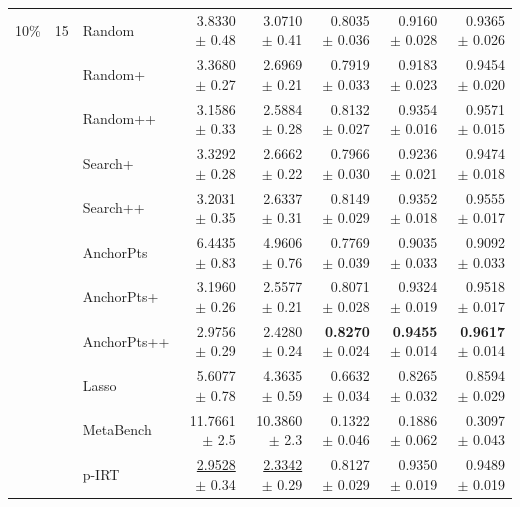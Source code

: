 \begin{longtable}{llp{}rrrrr}
\midrule
10\% & 15 & Random & 3.8330 {\scriptsize $\pm$ 0.48} & 3.0710 {\scriptsize $\pm$ 0.41} & 0.8035 {\scriptsize $\pm$ 0.036} & 0.9160 {\scriptsize $\pm$ 0.028} & 0.9365 {\scriptsize $\pm$ 0.026} \\
 &  & Random+ & 3.3680 {\scriptsize $\pm$ 0.27} & 2.6969 {\scriptsize $\pm$ 0.21} & 0.7919 {\scriptsize $\pm$ 0.033} & 0.9183 {\scriptsize $\pm$ 0.023} & 0.9454 {\scriptsize $\pm$ 0.020} \\
 &  & Random++ & 3.1586 {\scriptsize $\pm$ 0.33} & 2.5884 {\scriptsize $\pm$ 0.28} & 0.8132 {\scriptsize $\pm$ 0.027} & 0.9354 {\scriptsize $\pm$ 0.016} & 0.9571 {\scriptsize $\pm$ 0.015} \\
 &  & Search+ & 3.3292 {\scriptsize $\pm$ 0.28} & 2.6662 {\scriptsize $\pm$ 0.22} & 0.7966 {\scriptsize $\pm$ 0.030} & 0.9236 {\scriptsize $\pm$ 0.021} & 0.9474 {\scriptsize $\pm$ 0.018} \\
 &  & Search++ & 3.2031 {\scriptsize $\pm$ 0.35} & 2.6337 {\scriptsize $\pm$ 0.31} & 0.8149 {\scriptsize $\pm$ 0.029} & 0.9352 {\scriptsize $\pm$ 0.018} & 0.9555 {\scriptsize $\pm$ 0.017} \\
 &  & AnchorPts & 6.4435 {\scriptsize $\pm$ 0.83} & 4.9606 {\scriptsize $\pm$ 0.76} & 0.7769 {\scriptsize $\pm$ 0.039} & 0.9035 {\scriptsize $\pm$ 0.033} & 0.9092 {\scriptsize $\pm$ 0.033} \\
 &  & AnchorPts+ & 3.1960 {\scriptsize $\pm$ 0.26} & 2.5577 {\scriptsize $\pm$ 0.21} & 0.8071 {\scriptsize $\pm$ 0.028} & 0.9324 {\scriptsize $\pm$ 0.019} & 0.9518 {\scriptsize $\pm$ 0.017} \\
 &  & AnchorPts++ & 2.9756 {\scriptsize $\pm$ 0.29} & 2.4280 {\scriptsize $\pm$ 0.24} & \textbf{0.8270} {\scriptsize $\pm$ 0.024} & \textbf{0.9455} {\scriptsize $\pm$ 0.014} & \textbf{0.9617} {\scriptsize $\pm$ 0.014} \\
 &  & Lasso & 5.6077 {\scriptsize $\pm$ 0.78} & 4.3635 {\scriptsize $\pm$ 0.59} & 0.6632 {\scriptsize $\pm$ 0.034} & 0.8265 {\scriptsize $\pm$ 0.032} & 0.8594 {\scriptsize $\pm$ 0.029} \\
 &  & MetaBench & 11.7661 {\scriptsize $\pm$ 2.5} & 10.3860 {\scriptsize $\pm$ 2.3} & 0.1322 {\scriptsize $\pm$ 0.046} & 0.1886 {\scriptsize $\pm$ 0.062} & 0.3097 {\scriptsize $\pm$ 0.043} \\
 &  & p-IRT & \underline{2.9528} {\scriptsize $\pm$ 0.34} & \underline{2.3342} {\scriptsize $\pm$ 0.29} & 0.8127 {\scriptsize $\pm$ 0.029} & 0.9350 {\scriptsize $\pm$ 0.019} & 0.9489 {\scriptsize $\pm$ 0.019} \\

\end{longtable}
